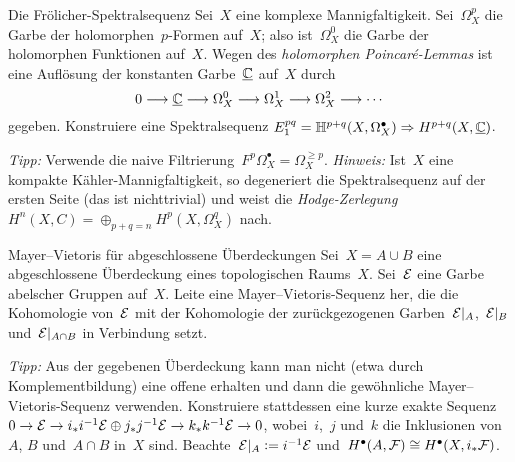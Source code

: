 \documentclass{uebblatt}
\begin{document}
\begin{aufgabe}{Die Frölicher-Spektralsequenz}
Sei~$X$ eine komplexe Mannigfaltigkeit. Sei~$\Omega_X^p$ die Garbe der
holomorphen~$p$-Formen auf~$X$; also ist~$\Omega_X^0$ die Garbe der holomorphen
Funktionen auf~$X$. Wegen des \emph{holomorphen Poincaré-Lemmas} ist eine
Auflösung der konstanten Garbe~$\underline{\mathbb{C}}$ auf~$X$ durch
\[ 0 \longrightarrow \underline{\mathbb{C}} \longrightarrow \Omega_X^0 \longrightarrow \Omega_X^1 \longrightarrow \Omega_X^2 \longrightarrow \cdots \]
gegeben. Konstruiere eine Spektralsequenz $E_1^{pq} = \mathbb{H}^{p+q}(X,
\Omega_X^\bullet) \Rightarrow H^{p+q}(X,\underline{\mathbb{C}})$.

{\tiny\emph{Tipp:} Verwende die naive Filtrierung~$F^p \Omega_X^\bullet =
\Omega_X^{\geq p}$. \emph{Hinweis:} Ist~$X$ eine kompakte
Kähler-Mannigfaltigkeit, so degeneriert die Spektralsequenz auf der ersten
Seite (das ist nichttrivial) und weist die \emph{Hodge-Zerlegung} $H^n(X,C) = \oplus_{p+q=n}
H^p(X,\Omega_X^q)$ nach.\par}
\end{aufgabe}

\begin{aufgabe}{Mayer--Vietoris für abgeschlossene Überdeckungen}
Sei~$X = A \cup B$ eine abgeschlossene Überdeckung eines topologischen
Raums~$X$. Sei~$\mathcal{E}$ eine Garbe abelscher Gruppen auf~$X$. Leite eine
Mayer--Vietoris-Sequenz her, die die Kohomologie von~$\mathcal{E}$ mit der Kohomologie
der zurückgezogenen Garben~$\mathcal{E}|_A$,~$\mathcal{E}|_B$ und~$\mathcal{E}|_{A \cap B}$ in Verbindung
setzt.

{\tiny\emph{Tipp:} Aus der gegebenen Überdeckung kann man nicht (etwa durch
Komplementbildung) eine offene erhalten und dann die gewöhnliche
Mayer--Vietoris-Sequenz verwenden. Konstruiere stattdessen eine kurze exakte
Sequenz~$0 \to \mathcal{E} \to i_* i^{-1} \mathcal{E} \oplus j_* j^{-1} \mathcal{E} \to k_* k^{-1} \mathcal{E} \to
0$, wobei~$i$,~$j$ und~$k$ die Inklusionen von~$A$, $B$ und~$A \cap B$ in~$X$
sind. Beachte~$\mathcal{E}|_A \vcentcolon= i^{-1} \mathcal{E}$ und~$H^\bullet(A,\mathcal{F}) \cong
H^\bullet(X,i_*\mathcal{F})$.\par}
\end{aufgabe}
\end{document}
